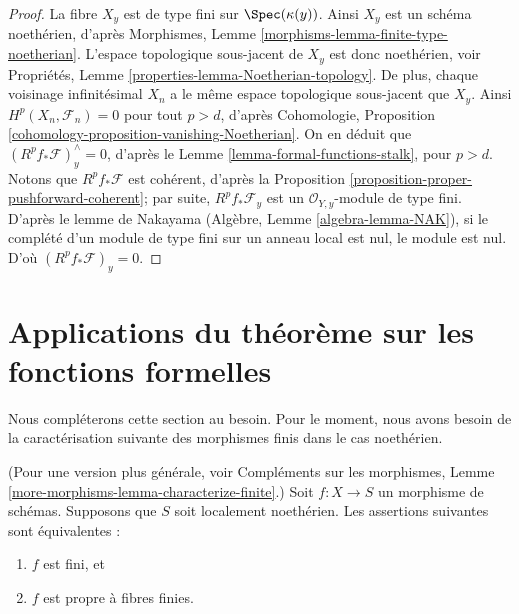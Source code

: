 \begin{proof}
La fibre $X_y$ est de type fini sur $\Spec(\kappa(y))$.
Ainsi $X_y$ est un schéma noethérien, d'après
Morphismes, Lemme \ref{morphisms-lemma-finite-type-noetherian}.
L'espace topologique sous-jacent de $X_y$ est donc noethérien, voir
Propriétés, Lemme \ref{properties-lemma-Noetherian-topology}.
De plus, chaque voisinage infinitésimal
$X_n$ a le même espace topologique sous-jacent que $X_y$.
Ainsi $H^p(X_n, \mathcal{F}_n) = 0$ pour tout $p > d$, d'après
Cohomologie, Proposition \ref{cohomology-proposition-vanishing-Noetherian}.
On en déduit que $(R^pf_*\mathcal{F})_y^\wedge = 0$,
d'après le Lemme \ref{lemma-formal-functions-stalk}, pour $p > d$.
Notons que $R^pf_*\mathcal{F}$ est cohérent, d'après la
Proposition \ref{proposition-proper-pushforward-coherent};
par suite, $R^pf_*\mathcal{F}_y$ est un
$\mathcal{O}_{Y, y}$-module de type fini. D'après le lemme de Nakayama
(Algèbre, Lemme \ref{algebra-lemma-NAK}),
si le complété d'un module de type fini sur un anneau local
est nul, le module est nul. D'où
$(R^pf_*\mathcal{F})_y = 0$.
\end{proof}





\section{Applications du théorème sur les fonctions formelles}
\label{section-applications-formal-functions}


\noindent
Nous compléterons cette section au besoin. Pour le moment, nous avons besoin de la
caractérisation suivante des morphismes finis dans le cas noethérien.

\begin{lemma}
\label{lemma-characterize-finite}
(Pour une version plus générale, voir
Compléments sur les morphismes, Lemme \ref{more-morphisms-lemma-characterize-finite}.)
Soit $f : X \to S$ un morphisme de schémas.
Supposons que $S$ soit localement noethérien.
Les assertions suivantes sont équivalentes :
\begin{enumerate}
\item $f$ est fini, et
\item $f$ est propre à fibres finies.
\end{enumerate}
\end{lemma}


